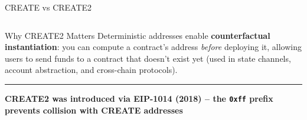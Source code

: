 \documentclass[8pt,aspectratio=169]{beamer}
\newcommand{\bottomnote}[1]{\vfill\vspace{-2mm}\textcolor{mllavender2}{\rule{\textwidth}{0.4pt}}\vspace{1mm}\footnotesize\textbf{#1}}
\begin{document}
\begin{frame}{CREATE vs CREATE2}
\begin{columns}
\begin{center}
\end{center}
\end{columns}
\vspace{3mm}
\begin{block}{Why CREATE2 Matters}
\small Deterministic addresses enable \textbf{counterfactual instantiation}: you can compute a contract's address \emph{before} deploying it, allowing users to send funds to a contract that doesn't exist yet (used in state channels, account abstraction, and cross-chain protocols).
\end{block}
\bottomnote{CREATE2 was introduced via EIP-1014 (2018) -- the \texttt{0xff} prefix prevents collision with CREATE addresses}
\end{frame}
\end{document}
